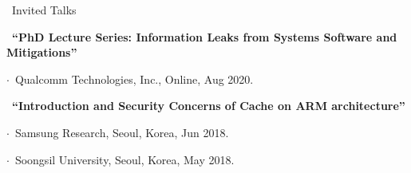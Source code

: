 \documentclass{resume} %
\begin{document}
\begin{rSection}{\faGenderless~Invited Talks}

    \strut\textbullet~{\bf ``PhD Lecture Series: Information Leaks from Systems Software and Mitigations''}\\
    \strut\hspace{1cm}$\cdot$~Qualcomm Technologies, Inc., Online, Aug 2020.\\
	
    \strut\textbullet~{\bf ``Introduction and Security Concerns of Cache on ARM architecture''}\\
	\strut\hspace{1cm}$\cdot$~Samsung Research, Seoul, Korea, Jun 2018.\\
	\strut\hspace{1cm}$\cdot$~Soongsil University, Seoul, Korea, May 2018.

	\vspace{3mm}
\end{rSection}

\end{document}
